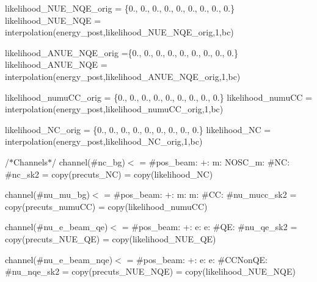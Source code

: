 likelihood\+\_\+\+N\+U\+E\+\_\+\+N\+Q\+E\+\_\+orig = \{0., 0., 0., 0., 0., 0., 0., 0., 0.\} likelihood\+\_\+\+N\+U\+E\+\_\+\+N\+QE = interpolation(energy\+\_\+post,likelihood\+\_\+\+N\+U\+E\+\_\+\+N\+Q\+E\+\_\+orig,1,bc)

likelihood\+\_\+\+A\+N\+U\+E\+\_\+\+N\+Q\+E\+\_\+orig =\{0., 0., 0., 0., 0., 0., 0., 0., 0.\} likelihood\+\_\+\+A\+N\+U\+E\+\_\+\+N\+QE = interpolation(energy\+\_\+post,likelihood\+\_\+\+A\+N\+U\+E\+\_\+\+N\+Q\+E\+\_\+orig,1,bc)

likelihood\+\_\+numu\+C\+C\+\_\+orig = \{0., 0., 0., 0., 0., 0., 0., 0., 0.\} likelihood\+\_\+numu\+CC = interpolation(energy\+\_\+post,likelihood\+\_\+numu\+C\+C\+\_\+orig,1,bc)

likelihood\+\_\+\+N\+C\+\_\+orig = \{0., 0., 0., 0., 0., 0., 0., 0., 0.\} likelihood\+\_\+\+NC = interpolation(energy\+\_\+post,likelihood\+\_\+\+N\+C\+\_\+orig,1,bc)

/$\ast$\+Channels$\ast$/ channel(\#nc\+\_\+bg)$<$  = \#pos\+\_\+beam\+: +\+: m\+: N\+O\+S\+C\+\_\+m\+: \#\+NC\+: \#nc\+\_\+sk2  = copy(precuts\+\_\+\+NC)  = copy(likelihood\+\_\+\+NC) \begin{quote}


\end{quote}


channel(\#nu\+\_\+mu\+\_\+bg)$<$  = \#pos\+\_\+beam\+: +\+: m\+: m\+: \#\+CC\+: \#nu\+\_\+mucc\+\_\+sk2  = copy(precuts\+\_\+numu\+CC)  = copy(likelihood\+\_\+numu\+CC) \begin{quote}


\end{quote}


channel(\#nu\+\_\+e\+\_\+beam\+\_\+qe)$<$  = \#pos\+\_\+beam\+: +\+: e\+: e\+: \#\+QE\+: \#nu\+\_\+qe\+\_\+sk2  = copy(precuts\+\_\+\+N\+U\+E\+\_\+\+QE)  = copy(likelihood\+\_\+\+N\+U\+E\+\_\+\+QE) \begin{quote}


\end{quote}


channel(\#nu\+\_\+e\+\_\+beam\+\_\+nqe)$<$  = \#pos\+\_\+beam\+: +\+: e\+: e\+: \#\+C\+C\+Non\+QE\+: \#nu\+\_\+nqe\+\_\+sk2  = copy(precuts\+\_\+\+N\+U\+E\+\_\+\+N\+QE)  = copy(likelihood\+\_\+\+N\+U\+E\+\_\+\+N\+QE) \begin{quote}


\end{quote}


